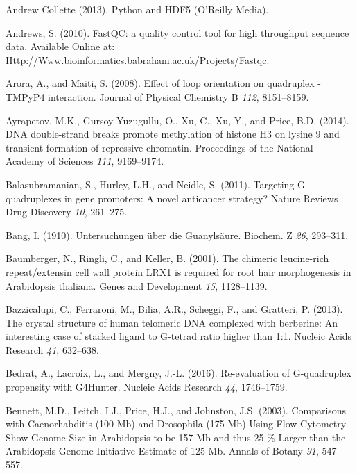 \documentclass[12pt,a4paper,]{report}
\begin{document}
\leavevmode\hypertarget{ref-Collette2013}{}%
Andrew Collette (2013). Python and HDF5 (O'Reilly Media).

\leavevmode\hypertarget{ref-Andrews2010}{}%
Andrews, S. (2010). FastQC: a quality control tool for high throughput
sequence data. Available Online at:
Http://Www.bioinformatics.babraham.ac.uk/Projects/Fastqc.

\leavevmode\hypertarget{ref-Arora2008}{}%
Arora, A., and Maiti, S. (2008). Effect of loop orientation on
quadruplex - TMPyP4 interaction. Journal of Physical Chemistry B
\emph{112}, 8151--8159.

\leavevmode\hypertarget{ref-Ayrapetov2014}{}%
Ayrapetov, M.K., Gursoy-Yuzugullu, O., Xu, C., Xu, Y., and Price, B.D.
(2014). DNA double-strand breaks promote methylation of histone H3 on
lysine 9 and transient formation of repressive chromatin. Proceedings of
the National Academy of Sciences \emph{111}, 9169--9174.

\leavevmode\hypertarget{ref-Balasubramanian2011}{}%
Balasubramanian, S., Hurley, L.H., and Neidle, S. (2011). Targeting
G-quadruplexes in gene promoters: A novel anticancer strategy? Nature
Reviews Drug Discovery \emph{10}, 261--275.

\leavevmode\hypertarget{ref-Bang1910}{}%
Bang, I. (1910). Untersuchungen über die Guanylsäure. Biochem. Z
\emph{26}, 293--311.

\leavevmode\hypertarget{ref-Baumberger2001}{}%
Baumberger, N., Ringli, C., and Keller, B. (2001). The chimeric
leucine-rich repeat/extensin cell wall protein LRX1 is required for root
hair morphogenesis in Arabidopsis thaliana. Genes and Development
\emph{15}, 1128--1139.

\leavevmode\hypertarget{ref-Bazzicalupi2013}{}%
Bazzicalupi, C., Ferraroni, M., Bilia, A.R., Scheggi, F., and Gratteri,
P. (2013). The crystal structure of human telomeric DNA complexed with
berberine: An interesting case of stacked ligand to G-tetrad ratio
higher than 1:1. Nucleic Acids Research \emph{41}, 632--638.

\leavevmode\hypertarget{ref-Bedrat2016}{}%
Bedrat, A., Lacroix, L., and Mergny, J.-L. (2016). Re-evaluation of
G-quadruplex propensity with G4Hunter. Nucleic Acids Research \emph{44},
1746--1759.

\leavevmode\hypertarget{ref-Bennett2003}{}%
Bennett, M.D., Leitch, I.J., Price, H.J., and Johnston, J.S. (2003).
Comparisons with Caenorhabditis (100 Mb) and Drosophila (175 Mb) Using
Flow Cytometry Show Genome Size in Arabidopsis to be 157 Mb and thus 25
\% Larger than the Arabidopsis Genome Initiative Estimate of 125 Mb.
Annals of Botany \emph{91}, 547--557.
\end{document}
